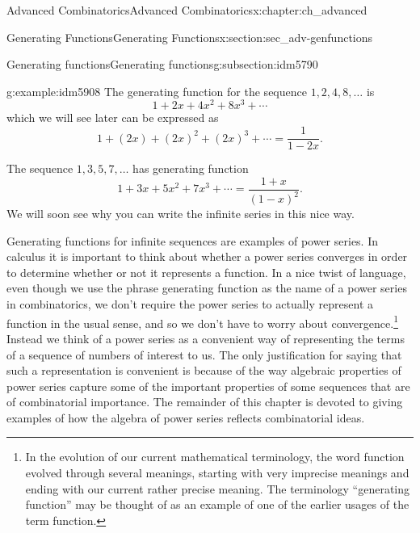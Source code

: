\documentclass[oneside,10pt,]{book}
\numberwithin{equation}{chapter}
\begin{document}
\begin{chapterptx}{Advanced Combinatorics}{}{Advanced Combinatorics}{}{}{x:chapter:ch_advanced}
\begin{sectionptx}{Generating Functions}{}{Generating Functions}{}{}{x:section:sec_adv-genfunctions}
\begin{subsectionptx}{Generating functions}{}{Generating functions}{}{}{g:subsection:idm5790}
\begin{example}{}{g:example:idm5908}
The generating function for the sequence \(1, 2, 4, 8, \ldots\) is%
\begin{equation*}
1 + 2x + 4x^2 + 8x^3 + \cdots
\end{equation*}
which we will see later can be expressed as%
\begin{equation*}
1+(2x) + (2x)^2 + (2x)^3 + \cdots = \frac{1}{1-2x}\text{.}
\end{equation*}
%
\par
The sequence \(1, 3, 5, 7,\ldots\) has generating function%
\begin{equation*}
1+3x + 5x^2 +7x^3 + \cdots = \frac{1+x}{(1-x)^2}\text{.}
\end{equation*}
We will soon see why you can write the infinite series in this nice way.%
\end{example}
Generating functions for infinite sequences are examples of power series. In calculus it is important to think about whether a power series converges in order to determine whether or not it represents a function. In a nice twist of language, even though we use the phrase generating function as the name of a power series in combinatorics, we don't require the power series to actually represent a function in the usual sense, and so we don't have to worry about convergence.\footnote{In the evolution of our current mathematical terminology, the word function evolved through several meanings, starting with very imprecise meanings and ending with our current rather precise meaning.  The terminology ``generating function'' may be thought of as an example of one of the earlier usages of the term function.\label{g:fn:idm5918}} Instead we think of a power series as a convenient way of representing the terms of a sequence of numbers of interest to us. The only justification for saying that such a representation is convenient is because of the way algebraic properties of power series capture some of the important properties of some sequences that are of combinatorial importance. The remainder of this chapter is devoted to giving examples of how the algebra of power series reflects combinatorial ideas.%
\par

\end{subsectionptx}
\end{sectionptx}
\end{chapterptx}
\end{document}
